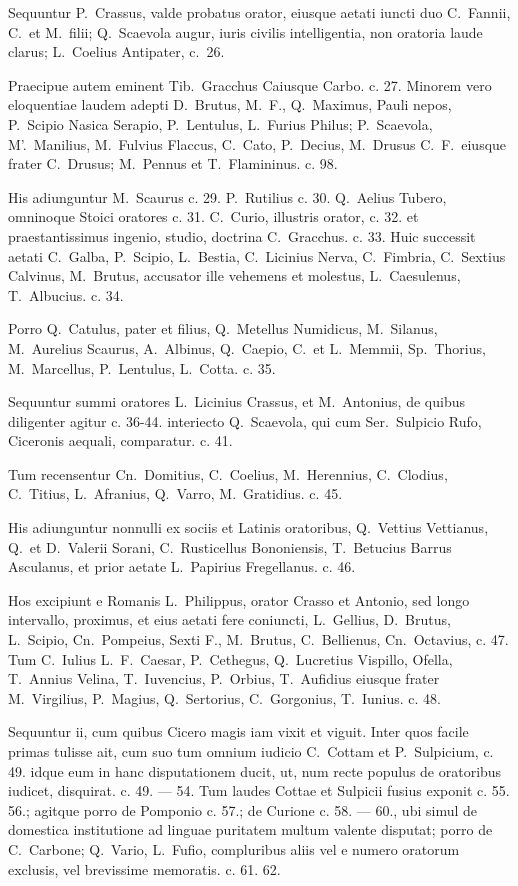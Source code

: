 Sequuntur P.~Crassus, valde probatus orator, eiusque aetati iuncti duo C.~Fannii, C.\ et M.\ filii; Q.~Scaevola augur, iuris civilis intelligentia, non oratoria laude clarus; L.~Coelius Antipater, c.\ 26. 

Praecipue autem eminent Tib.~Gracchus Caiusque Carbo. c. 27. Minorem vero eloquentiae laudem adepti D.~Brutus, M.\ F., Q.~Maximus, Pauli nepos, P.~Scipio Nasica Serapio, P.~Lentulus, L.~Furius Philus; P.~Scaevola, M'.~Manilius, M.~Fulvius Flaccus, C.~Cato, P.~Decius, M.~Drusus C.~F.\ eiusque frater C.~Drusus; M.~Pennus et T.~Flamininus. c. 98. 

His adiunguntur M.~Scaurus c. 29. P.~Rutilius c. 30. Q.~Aelius Tubero, omninoque Stoici oratores c. 31. C.~Curio, illustris orator, c. 32. et praestantissimus ingenio, studio, doctrina C.~Gracchus. c. 33. Huic successit aetati C.~Galba, P.~Scipio, L.~Bestia, C.~Licinius Nerva, C.~Fimbria, C.~Sextius Calvinus, M.~Brutus, accusator ille vehemens et molestus, L.~Caesulenus, T.~Albucius. c. 34.

Porro Q.~Catulus, pater et filius, Q.~Metellus Numidicus, M.~Silanus, M.~Aurelius Scaurus, A.~Albinus, Q.~Caepio, C.\ et L.~Memmii, Sp.~Thorius, M.~Marcellus, P.~Lentulus, L.~Cotta. c. 35.

Sequuntur summi oratores L.~Licinius Crassus, et M.~Antonius, de quibus diligenter agitur c. 36-44. interiecto Q.~Scaevola, qui cum Ser.~Sulpicio Rufo, Ciceronis aequali, comparatur. c. 41.

Tum recensentur Cn.~Domitius, C.~Coelius, M.~Herennius, C.~Clodius, C.~Titius, L.~Afranius, Q.~Varro, M.~Gratidius. c. 45.

His adiunguntur nonnulli ex sociis et Latinis oratoribus, Q.~Vettius Vettianus, Q.\ et D.~Valerii Sorani, C.~Rusticellus Bononiensis, T.~Betucius Barrus Asculanus, et prior aetate L.~Papirius Fregellanus. c. 46.

Hos excipiunt e Romanis L.~Philippus, orator Crasso et Antonio, sed longo intervallo, proximus, et eius aetati fere coniuncti, L.~Gellius, D.~Brutus, L.~Scipio, Cn.~Pompeius, Sexti F., M.~Brutus, C.~Bellienus, Cn.~Octavius, c. 47. Tum C.~Iulius L.~F.\ Caesar, P.~Cethegus, Q.~Lucretius Vispillo, Ofella, T.~Annius Velina, T.~Iuvencius, P.~Orbius, T.~Aufidius eiusque frater M.~Virgilius, P.~Magius, Q.~Sertorius, C.~Gorgonius, T.~Iunius. c. 48.

Sequuntur ii, cum quibus Cicero magis iam vixit et viguit. Inter quos facile primas tulisse ait, cum suo tum omnium iudicio C.~Cottam et P.~Sulpicium, c. 49. idque eum in hanc disputationem ducit, ut, num recte populus de oratoribus iudicet, disquirat. c. 49. — 54. Tum laudes Cottae et Sulpicii fusius exponit c. 55. 56.; agitque porro de Pomponio c. 57.; de Curione c. 58. — 60., ubi simul de domestica institutione ad linguae puritatem multum valente disputat; porro de C.~Carbone; Q.~Vario, L.~Fufio, compluribus aliis vel e numero oratorum exclusis, vel brevissime memoratis. c. 61. 62.

